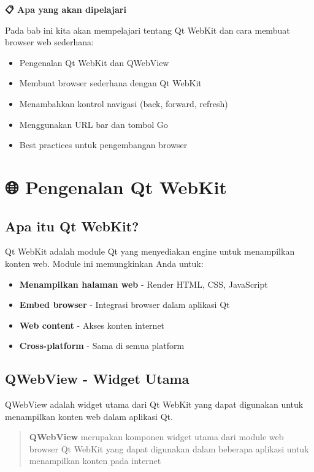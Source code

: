 \textbf{📋 Apa yang akan dipelajari}

Pada bab ini kita akan mempelajari tentang Qt WebKit dan cara membuat browser web sederhana:

\begin{itemize}
\item Pengenalan Qt WebKit dan QWebView
\item Membuat browser sederhana dengan Qt WebKit
\item Menambahkan kontrol navigasi (back, forward, refresh)
\item Menggunakan URL bar dan tombol Go
\item Best practices untuk pengembangan browser
\end{itemize}

\minitoc

\section{🌐 Pengenalan Qt WebKit}

\subsection{Apa itu Qt WebKit?}

Qt WebKit adalah module Qt yang menyediakan engine untuk menampilkan konten web. Module ini memungkinkan Anda untuk:

\begin{itemize}
\item \textbf{Menampilkan halaman web} - Render HTML, CSS, JavaScript
\item \textbf{Embed browser} - Integrasi browser dalam aplikasi Qt
\item \textbf{Web content} - Akses konten internet
\item \textbf{Cross-platform} - Sama di semua platform
\end{itemize}

\subsection{QWebView - Widget Utama}

QWebView adalah widget utama dari Qt WebKit yang dapat digunakan untuk menampilkan konten web dalam aplikasi Qt.

\begin{quote}
\textbf{QWebView} merupakan komponen widget utama dari module web browser Qt WebKit yang dapat digunakan dalam beberapa aplikasi untuk menampilkan konten pada internet
\end{quote}

